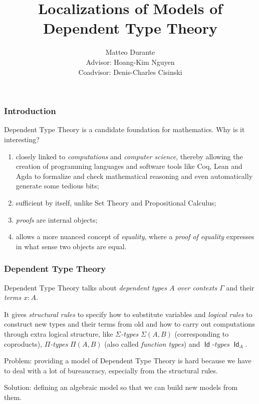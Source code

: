 \documentclass{beamer}
\title{Localizations of Models of Dependent Type Theory}
\author{Matteo Durante \\ Advisor: Hoang-Kim Nguyen \\ Coadvisor: Denis-Charles
Cisinski}
\institute{Regensburg University}
\DeclareMathOperator{\Id}{\mathsf{Id}}
\begin{document}
\newtheorem{thm}{Theorem}[section]
\newtheorem{defn}{Definition}[section]
\newtheorem{conj}{Conjecture}[section]
\newtheorem{lem}{Lemma}[section]

\frame{\titlepage}

\begin{frame}
  \frametitle{Introduction}

  Dependent Type Theory is a candidate foundation for mathematics. Why is it
  interesting?

  \begin{enumerate}
    \item closely linked to \emph{computations} and \emph{computer science},
      thereby allowing the creation of programming languages and software tools
      like Coq, Lean and Agda to formalize and check mathematical reasoning and
      even automatically generate some tedious bits;
    \item sufficient by itself, unlike Set Theory and Propositional Calculus;
    \item \emph{proofs} are internal objects;
    \item allows a more nuanced concept of \emph{equality}, where a \emph{proof of
      equality} expresses in what sense two objects are equal.
  \end{enumerate}
\end{frame}

\begin{frame}
  \frametitle{Dependent Type Theory}
  Dependent Type Theory talks about \emph{dependent types $A$ over contexts
  $\Gamma$} and their \emph{terms $x:A$}.

  It gives \emph{structural rules} to specify how to substitute variables and
  \emph{logical rules} to construct new types and their terms
  from old and how to carry out computations
  through extra logical structure, like \emph{$\Sigma$-types}
  $\Sigma(A,B)$ (corresponding to coproducts), \emph{$\Pi$-types} $\Pi(A,B)$
  (also called \emph{function types}) and \emph{$\Id$-types} $\Id_A$.

  Problem: providing a model of Dependent Type Theory is hard because we have to
  deal with a lot of bureaucracy, especially from the structural rules.

  Solution: defining an algebraic model so that we can build new models from
  them.
\end{frame}
\end{document}
